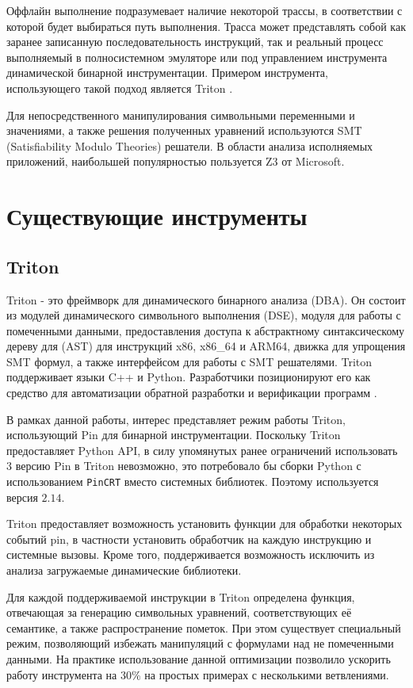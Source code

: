 Оффлайн выполнение подразумевает наличие некоторой трассы, в соответствии с которой будет выбираться путь выполнения. Трасса может представлять собой как заранее записанную последовательность инструкций, так и реальный процесс выполняемый в полносистемном эмуляторе или под управлением инструмента динамической бинарной инструментации.
Примером инструмента, использующего такой подход является Triton \cite{Triton}.

Для непосредственного манипулирования символьными переменными и значениями, а также решения полученных уравнений используются SMT (Satisfiability Modulo Theories) решатели. В области анализа исполняемых приложений, наибольшей популярностью пользуется Z3 \cite{Z3} от Microsoft.



\section{Существующие инструменты}


\subsection{Triton}

Triton - это фреймворк для динамического бинарного анализа (DBA). Он состоит из модулей динамического символьного выполнения (DSE), модуля для работы с помеченными данными, предоставления доступа к абстрактному синтаксическому дереву для (AST) для инструкций x86, x86\_64 и ARM64, движка для упрощения SMT формул, а также интерфейсом для работы с SMT решателями. Triton поддерживает языки C++ и Python.
Разработчики позиционируют его как средство для автоматизации обратной разработки и верификации программ \cite{Triton}.

В рамках данной работы, интерес представляет режим работы Triton, использующий Pin для бинарной инструментации. Поскольку Triton предоставляет Python API, в силу упомянутых ранее ограничений  использовать $3$ версию Pin в Triton невозможно, это потребовало бы сборки Python с использованием \texttt{PinCRT} вместо системных библиотек. Поэтому используется версия $2.14$.

Triton предоставляет возможность установить функции для обработки некоторых событий pin, в частности установить обработчик на каждую инструкцию и системные вызовы. Кроме того, поддерживается возможность исключить из анализа загружаемые динамические библиотеки.

Для каждой поддерживаемой инструкции в Triton определена функция, отвечающая за генерацию символьных уравнений, соответствующих её семантике, а также распространение пометок. При этом существует специальный режим, позволяющий избежать манипуляций с формулами над не помеченными данными. На практике использование данной оптимизации позволило ускорить работу инструмента на 30\% на простых примерах с несколькими ветвлениями.


